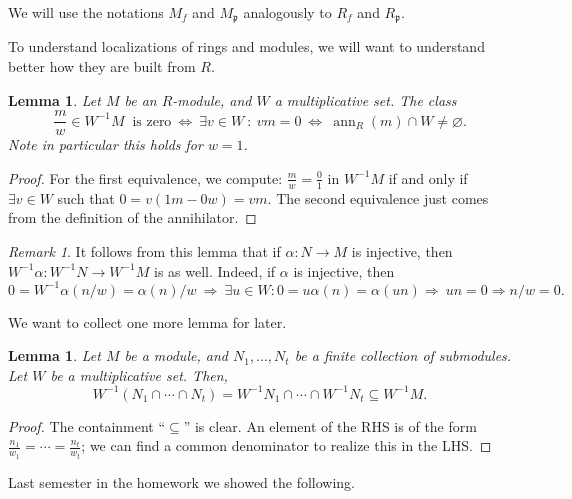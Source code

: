 \documentclass{amsart}[12pt]
\def\ann{\operatorname{ann}}
\newcommand{\p}{{\mathfrak p}}
\numberwithin{equation}{section}
\theoremstyle{plain} %
\newtheorem{lemma}[equation]{Lemma}
\theoremstyle{definition}
\theoremstyle{remark}
\newtheorem{remark}[equation]{Remark}
\begin{document}
We will use the notations $M_f$ and $M_{\p}$\index{$M_{\p}$} analogously to $R_f$ and $R_{\p}$.

To understand localizations of rings and modules, we will want to understand better how they are built from $R$.



\begin{lemma}
	Let $M$ be an $R$-module, and $W$ a multiplicative set. The class 
	\[ \frac{m}{w}\in W^{-1}M \ \text{ is zero} \ \iff \  \exists v\in W \ : \ vm=0   \ \iff \ \ann_R(m) \cap W \neq \varnothing.\]
	Note in particular this holds for $w=1$.
\end{lemma}
\begin{proof}
	For the first equivalence, we compute: $\frac{m}{w}=\frac{0}{1}$ in $W^{-1}M$ if and only if $\exists v\in W$ such that $0=v(1m-0w)=vm$. The second equivalence just comes from the definition of the annihilator.
\end{proof}

\begin{remark}
	It follows from this lemma that if $\alpha:N\to M$ is injective, then $W^{-1}\alpha: W^{-1}N\to W^{-1}M$ is as well. Indeed, if $\alpha$ is injective, then
	\[ 0=W^{-1}\alpha(n/w)=\alpha(n)/w \ \Rightarrow \ \exists u\in W : 0=u\alpha(n)=\alpha(un) \Rightarrow \ un=0 \Rightarrow n/w=0.\]
\end{remark}





We want to collect one more lemma for later.

\begin{lemma} Let $M$ be a module, and $N_1,\dots,N_t$ be a finite collection of submodules. Let $W$ be a multiplicative set. Then,
	\[ W^{-1} (N_1 \cap \cdots \cap N_t) = W^{-1} N_1 \cap \cdots \cap W^{-1} N_t \subseteq W^{-1}M.\]
\end{lemma}
\begin{proof}
	The containment ``$\subseteq$'' is clear. An element of the RHS is of the form $\frac{n_1}{w_1}= \cdots = \frac{n_t}{w_t}$; we can find a common denominator to realize this in the LHS.
\end{proof}

Last semester in the homework we showed the following.
\end{document}

